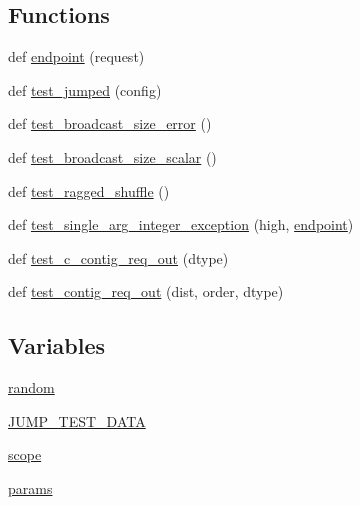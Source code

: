 \subsection*{Functions}
\begin{DoxyCompactItemize}
\item 
def \hyperlink{namespacenumpy_1_1random_1_1tests_1_1test__generator__mt19937_a3cf8952087f960f78b86fcf9dc3f6a1e}{endpoint} (request)
\item 
def \hyperlink{namespacenumpy_1_1random_1_1tests_1_1test__generator__mt19937_a232de68362183d9936fe810c425c7764}{test\+\_\+jumped} (config)
\item 
def \hyperlink{namespacenumpy_1_1random_1_1tests_1_1test__generator__mt19937_a30f97db812821c129f29e02dcb36080d}{test\+\_\+broadcast\+\_\+size\+\_\+error} ()
\item 
def \hyperlink{namespacenumpy_1_1random_1_1tests_1_1test__generator__mt19937_a09ad6fcc1865700f3b4f89a68e00a066}{test\+\_\+broadcast\+\_\+size\+\_\+scalar} ()
\item 
def \hyperlink{namespacenumpy_1_1random_1_1tests_1_1test__generator__mt19937_a7617af5efea1515c19b353c338142a97}{test\+\_\+ragged\+\_\+shuffle} ()
\item 
def \hyperlink{namespacenumpy_1_1random_1_1tests_1_1test__generator__mt19937_a12212e056063548c15374dea80f3c1a1}{test\+\_\+single\+\_\+arg\+\_\+integer\+\_\+exception} (high, \hyperlink{namespacenumpy_1_1random_1_1tests_1_1test__generator__mt19937_a3cf8952087f960f78b86fcf9dc3f6a1e}{endpoint})
\item 
def \hyperlink{namespacenumpy_1_1random_1_1tests_1_1test__generator__mt19937_a9c3e71fc21031c419a8ecc5cc5ad2cc4}{test\+\_\+c\+\_\+contig\+\_\+req\+\_\+out} (dtype)
\item 
def \hyperlink{namespacenumpy_1_1random_1_1tests_1_1test__generator__mt19937_a9620a4cd08ae34a2696db9eb84156498}{test\+\_\+contig\+\_\+req\+\_\+out} (dist, order, dtype)
\end{DoxyCompactItemize}
\subsection*{Variables}
\begin{DoxyCompactItemize}
\item 
\hyperlink{namespacenumpy_1_1random_1_1tests_1_1test__generator__mt19937_a487152a2fec1100864ed046c81a4221a}{random}
\item 
\hyperlink{namespacenumpy_1_1random_1_1tests_1_1test__generator__mt19937_a8e78e00809ee749b3e13c961dd763ba4}{J\+U\+M\+P\+\_\+\+T\+E\+S\+T\+\_\+\+D\+A\+TA}
\item 
\hyperlink{namespacenumpy_1_1random_1_1tests_1_1test__generator__mt19937_a658ae8d1441450ea1b1eb07d594ef920}{scope}
\item 
\hyperlink{namespacenumpy_1_1random_1_1tests_1_1test__generator__mt19937_aa08890c00d103ba5492fb344d78363b1}{params}
\end{DoxyCompactItemize}



